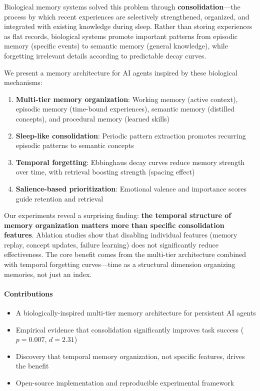 \documentclass[11pt]{article}
\begin{document}
Biological memory systems solved this problem through \textbf{consolidation}---the process by which recent experiences are selectively strengthened, organized, and integrated with existing knowledge during sleep. Rather than storing experiences as flat records, biological systems promote important patterns from episodic memory (specific events) to semantic memory (general knowledge), while forgetting irrelevant details according to predictable decay curves.

We present a memory architecture for AI agents inspired by these biological mechanisms:

\begin{enumerate}
    \item \textbf{Multi-tier memory organization}: Working memory (active context), episodic memory (time-bound experiences), semantic memory (distilled concepts), and procedural memory (learned skills)
    \item \textbf{Sleep-like consolidation}: Periodic pattern extraction promotes recurring episodic patterns to semantic concepts
    \item \textbf{Temporal forgetting}: Ebbinghaus decay curves reduce memory strength over time, with retrieval boosting strength (spacing effect)
    \item \textbf{Salience-based prioritization}: Emotional valence and importance scores guide retention and retrieval
\end{enumerate}

Our experiments reveal a surprising finding: \textbf{the temporal structure of memory organization matters more than specific consolidation features}. Ablation studies show that disabling individual features (memory replay, concept updates, failure learning) does not significantly reduce effectiveness. The core benefit comes from the multi-tier architecture combined with temporal forgetting curves---time as a structural dimension organizing memories, not just an index.

\paragraph{Contributions}
\begin{itemize}
    \item A biologically-inspired multi-tier memory architecture for persistent AI agents
    \item Empirical evidence that consolidation significantly improves task success ($p=0.007$, $d=2.31$)
    \item Discovery that temporal memory organization, not specific features, drives the benefit
    \item Open-source implementation and reproducible experimental framework
\end{itemize}
\end{document}
